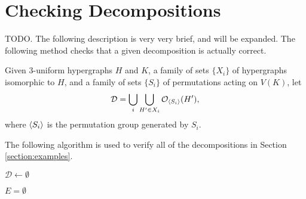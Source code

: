 \section{Checking Decompositions}

TODO. The following description is very very brief, and will be expanded.
The following method checks that a given decomposition is actually correct.

Given $3$-uniform hypergraphs $H$ and $K$, a family of sets $\{X_i\}$ of hypergraphs isomorphic to $H$, and a family of sets $\{S_i\}$ of permutations acting on $V(K)$, let
\[
    \mathcal{D} = \bigcup_{i} \bigcup_{H' \in X_i} \mathcal{O}_{\left\langle S_i \right\rangle}(H'),
\]
where $\left\langle S_i \right\rangle$ is the permutation group generated by $S_i$.

The following algorithm is used to verify all of the decompositions in Section \ref{section:examples}.

\begin{algorithm}

$\mathcal{D} \gets \emptyset$\;

$E = \emptyset$\;

 

\caption{} \label{alg:check}

\end{algorithm}